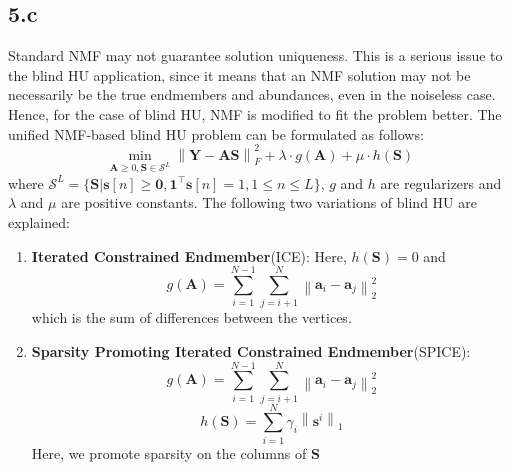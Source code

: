 \documentclass[12pt]{article}
\newcommand{\norm}[1]{\left\lVert #1 \right\rVert}
\begin{document}
\subsection*{5.c}
Standard NMF may not guarantee solution uniqueness. This is a serious issue to the blind HU application, since it means that an NMF solution may not be necessarily be the true endmembers and abundances, even in the noiseless case. Hence, for the case of blind HU, NMF is modified to fit the problem better. The unified NMF-based blind HU problem can be formulated as follows:
$$\min \limits_{\boldsymbol{A} \geq 0, \boldsymbol{S} \in \mathcal{S}^L}\norm{\boldsymbol{Y} - \boldsymbol{A} \boldsymbol{S}}_F^2 + \lambda \cdot g(\boldsymbol{A}) + \mu \cdot h(\boldsymbol{S})$$
where $\mathcal{S}^L = \{\boldsymbol{S} | \boldsymbol{s}[n] \geq \boldsymbol{0}, \boldsymbol{1}^\intercal \boldsymbol{s}[n] = 1, 1 \leq n \leq L\}$, $g$ and $h$ are regularizers and $\lambda$ and $\mu$ are positive constants. The following two variations of blind HU are explained:
\begin{enumerate}
	\item \textbf{Iterated Constrained Endmember}(ICE):\newline
	Here, $h(\boldsymbol{S}) = 0$ and 
	$$g(\boldsymbol{A}) = \sum \limits_{i=1}^{N-1}\sum \limits_{j=i+1}^N \norm{\boldsymbol{a}_i - \boldsymbol{a}_j}_2^2$$
	which is the sum of differences between the vertices.
	\item \textbf{Sparsity Promoting Iterated Constrained Endmember}(SPICE):\newline
	$$g(\boldsymbol{A}) = \sum \limits_{i=1}^{N-1}\sum \limits_{j=i+1}^N \norm{\boldsymbol{a}_i - \boldsymbol{a}_j}_2^2$$
	$$h(\boldsymbol{S}) = \sum \limits_{i=1}^N \gamma_i \norm{\boldsymbol{s}^i}_1$$
	Here, we promote sparsity on the columns of $\boldsymbol{S}$
\end{enumerate}
\end{document}
